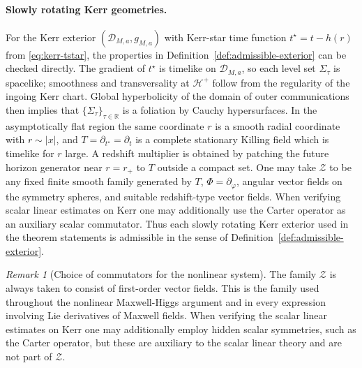 \documentclass[11pt]{article}
\numberwithin{equation}{section}
\theoremstyle{plain}
\theoremstyle{definition}
\theoremstyle{remark}
\newtheorem{remark}{Remark}[section]
\begin{document}
\paragraph{Slowly rotating Kerr geometries.}
For the Kerr exterior $(\mathcal D_{M,a},g_{M,a})$ with Kerr-star time function $t^{\star}=t-h(r)$ from \eqref{eq:kerr-tstar}, the properties in Definition~\ref{def:admissible-exterior} can be checked directly. The gradient of $t^{\star}$ is timelike on $\mathcal D_{M,a}$, so each level set $\Sigma_{\tau}$ is spacelike; smoothness and transversality at $\mathcal H^{+}$ follow from the regularity of the ingoing Kerr chart. Global hyperbolicity of the domain of outer communications then implies that $\{\Sigma_{\tau}\}_{\tau\in\mathbb R}$ is a foliation by Cauchy hypersurfaces. In the asymptotically flat region the same coordinate $r$ is a smooth radial coordinate with $r\sim |x|$, and $T=\partial_{t^{\star}}=\partial_{t}$ is a complete stationary Killing field which is timelike for $r$ large. A redshift multiplier is obtained by patching the future horizon generator near $r=r_{+}$ to $T$ outside a compact set. One may take $\mathcal Z$ to be any fixed finite smooth family generated by $T$, $\Phi=\partial_{\varphi}$, angular vector fields on the symmetry spheres, and suitable redshift-type vector fields. When verifying scalar linear estimates on Kerr one may additionally use the Carter operator as an auxiliary scalar commutator. Thus each slowly rotating Kerr exterior used in the theorem statements is admissible in the sense of Definition~\ref{def:admissible-exterior}.

\begin{remark}[Choice of commutators for the nonlinear system]\label{rem:commutators-nonlinear}
The family $\mathcal Z$ is always taken to consist of first-order vector fields. This is the family used throughout the nonlinear Maxwell-Higgs argument and in every expression involving Lie derivatives of Maxwell fields. When verifying the scalar linear estimates on Kerr one may additionally employ hidden scalar symmetries, such as the Carter operator, but these are auxiliary to the scalar linear theory and are not part of $\mathcal Z$.
\end{remark}



\medskip
\end{document}
